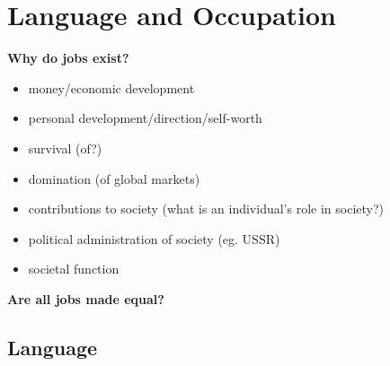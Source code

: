 \documentclass[../main.tex]{subfiles}
\begin{document}
\section{Language and Occupation}

\textbf{Why do jobs exist?}
\begin{itemize}
	\item money/economic development
	\item personal development/direction/self-worth
	\item survival (of?)
	\item domination (of global markets)
	\item contributions to society (what is an individual's role in society?)
	\item political administration of society (eg. USSR)
	\item societal function
\end{itemize}

\textbf{Are all jobs made equal?}

\subsection{Language}
\end{document}
